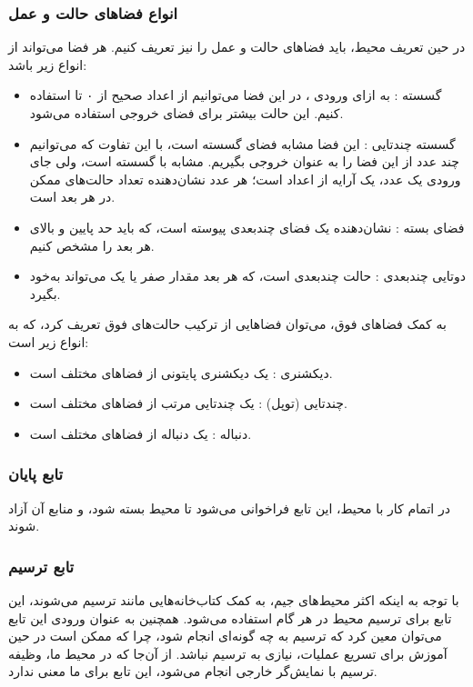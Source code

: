 \subsubsection{انواع فضا‌های حالت و عمل}
در حین تعریف محیط، باید فضا‌های حالت و عمل را نیز تعریف کنیم.
هر فضا می‌تواند از انواع زیر باشد:
\begin{itemize}
    \item گسسته : به ازای ورودی ، در این فضا می‌توانیم از اعداد صحیح از ۰ تا  استفاده کنیم.
    این حالت بیشتر برای فضای خروجی استفاده می‌شود.
    \item گسسته چند‌تایی : این فضا مشابه فضای گسسته است، با این تفاوت که می‌توانیم چند عدد از این فضا را به عنوان خروجی بگیریم.
    مشابه با گسسته است، ولی جای ورودی یک عدد، یک آرایه از اعداد است؛ هر عدد نشان‌دهنده تعداد حالت‌های ممکن در هر بعد است.
    \item فضای بسته : نشان‌دهنده یک فضای چند‌بعدی پیوسته است، که باید حد پایین و بالای هر بعد را مشخص کنیم.
    \item دوتایی چند‌بعدی : حالت چند‌بعدی است، که هر بعد مقدار صفر یا یک می‌تواند به‌خود بگیرد.
\end{itemize}
به کمک فضا‌های فوق، می‌توان فضا‌هایی از ترکیب حالت‌های فوق تعریف کرد، که به انواع زیر است:
\begin{itemize}
    \item دیکشنری : یک دیکشنری پایتونی از فضا‌های مختلف است.
    \item چندتایی (توپل) : یک چندتایی مرتب از فضا‌های مختلف است.
    \item دنباله : یک دنباله از فضا‌های مختلف است.
\end{itemize}

\subsubsection{تابع پایان}
در اتمام کار با محیط، این تابع فراخوانی می‌شود تا محیط بسته شود، و منابع آن آزاد شوند.
\subsubsection{تابع ترسیم}
با توجه به اینکه اکثر محیط‌های جیم، به کمک کتاب‌خانه‌هایی مانند 
ترسیم می‌شوند، این تابع برای ترسیم محیط در هر گام استفاده می‌شود.
همچنین به عنوان ورودی این تابع می‌توان معین کرد که ترسیم به چه گونه‌ای انجام شود، چرا که ممکن است در حین آموزش برای تسریع عملیات، نیازی به ترسیم نباشد.
از آن‌جا که در محیط ما، وظیفه ترسیم با نمایش‌گر خارجی انجام می‌شود، این تابع برای ما معنی ندارد. 
